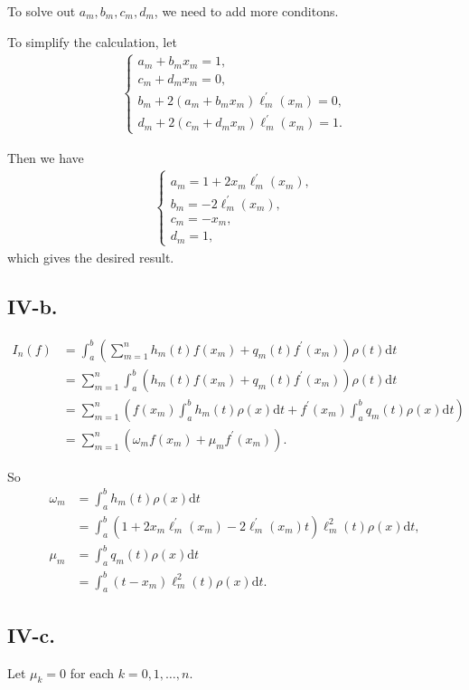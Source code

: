\documentclass[a4paper]{article}
\begin{document}
To solve out $a_m,b_m,c_m,d_m$, we need to add more conditons.

To simplify the calculation, let
$$
\begin{aligned}
  \begin{cases}
  a_m+b_m x_m=1,\\
  c_m+d_m x_m=0,\\
  b_m + 2(a_m+b_m x_m)\ell_m^{\prime}(x_m)=0,\\
  d_m + 2(c_m+d_m x_m)\ell_m^{\prime}(x_m)=1.
  \end{cases}
\end{aligned}
$$

Then we have
$$
\begin{aligned}
  \left\{\begin{array}{l}
    a_m=1+2x_m \ell_m^{\prime}(x_m),\\
    b_m=-2\ell_m^{\prime}(x_m),\\
    c_m=-x_m,\\
    d_m=1,
  \end{array}\right.
\end{aligned}
$$
which gives the desired result.

\subsection*{IV-b.}
$$
\begin{aligned}
  I_{n}(f)&=\int_{a}^{b}(\sum_{m=1}^{n}h_{m}(t)f(x_{m})+q_{m}(t)f^{\prime}(x_{m}))\rho(t)\mathrm{d}t\\
  &=\sum_{m=1}^{n}\int_{a}^{b}(h_{m}(t)f(x_{m})+q_{m}(t)f^{\prime}(x_{m}))\rho(t)\mathrm{d}t\\
  &=\sum_{m=1}^{n}(f(x_{m})\int_{a}^{b}h_{m}(t)\rho(x)\mathrm{d}t +f^{\prime}(x_{m})\int_{a}^{b}q_{m}(t)\rho(x)\mathrm{d}t )\\
  &=\sum_{m=1}^{n}(\omega_{m}f(x_{m})+\mu_{m}f^{\prime}(x_{m})).
\end{aligned}
$$

So 
$$
\begin{aligned}
  \omega_m&=\int_{a}^{b}h_{m}(t)\rho(x)\mathrm{d}t\\
  &=\int_{a}^{b}(1+2x_m\ell_m^{\prime}(x_m)-2\ell_m^{\prime}(x_m)t)\ell_m^2(t)\rho(x)\mathrm{d}t,\\
  \mu_m&=\int_{a}^{b}q_{m}(t)\rho(x)\mathrm{d}t\\
  &=\int_{a}^{b}(t-x_m)\ell_m^2(t)\rho(x)\mathrm{d}t.
\end{aligned}
$$

\subsection*{IV-c.}
Let $\mu_k=0$ for each $k=0,1,\ldots,n$.
\end{document}
